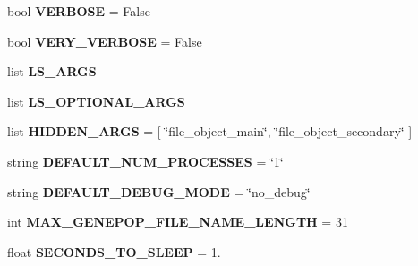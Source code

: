\begin{DoxyCompactItemize}
\item 
bool {\bfseries V\+E\+R\+B\+O\+SE} = False\hypertarget{namespacenegui_1_1pgdriveneestimator_aeae180a6a906ac89f58c9af1f6c8fd77}{}\label{namespacenegui_1_1pgdriveneestimator_aeae180a6a906ac89f58c9af1f6c8fd77}

\item 
bool {\bfseries V\+E\+R\+Y\+\_\+\+V\+E\+R\+B\+O\+SE} = False\hypertarget{namespacenegui_1_1pgdriveneestimator_ab3e4d5f9e16fe1e71748c637b908eb55}{}\label{namespacenegui_1_1pgdriveneestimator_ab3e4d5f9e16fe1e71748c637b908eb55}

\item 
list {\bfseries L\+S\+\_\+\+A\+R\+GS}
\item 
list {\bfseries L\+S\+\_\+\+O\+P\+T\+I\+O\+N\+A\+L\+\_\+\+A\+R\+GS}
\item 
list {\bfseries H\+I\+D\+D\+E\+N\+\_\+\+A\+R\+GS} = \mbox{[} \char`\"{}file\+\_\+object\+\_\+main\char`\"{}, \char`\"{}file\+\_\+object\+\_\+secondary\char`\"{} \mbox{]}\hypertarget{namespacenegui_1_1pgdriveneestimator_a6fd954e84a4eb8eeb2a1a63e5f53c716}{}\label{namespacenegui_1_1pgdriveneestimator_a6fd954e84a4eb8eeb2a1a63e5f53c716}

\item 
string {\bfseries D\+E\+F\+A\+U\+L\+T\+\_\+\+N\+U\+M\+\_\+\+P\+R\+O\+C\+E\+S\+S\+ES} = \char`\"{}1\char`\"{}\hypertarget{namespacenegui_1_1pgdriveneestimator_a2e948c0ce60271c8e6e3b08edb453839}{}\label{namespacenegui_1_1pgdriveneestimator_a2e948c0ce60271c8e6e3b08edb453839}

\item 
string {\bfseries D\+E\+F\+A\+U\+L\+T\+\_\+\+D\+E\+B\+U\+G\+\_\+\+M\+O\+DE} = \char`\"{}no\+\_\+debug\char`\"{}\hypertarget{namespacenegui_1_1pgdriveneestimator_af83e46ff34683de5b4e27783ac68425f}{}\label{namespacenegui_1_1pgdriveneestimator_af83e46ff34683de5b4e27783ac68425f}

\item 
int {\bfseries M\+A\+X\+\_\+\+G\+E\+N\+E\+P\+O\+P\+\_\+\+F\+I\+L\+E\+\_\+\+N\+A\+M\+E\+\_\+\+L\+E\+N\+G\+TH} = 31\hypertarget{namespacenegui_1_1pgdriveneestimator_aaaca09e92573315d60360d27b83338ee}{}\label{namespacenegui_1_1pgdriveneestimator_aaaca09e92573315d60360d27b83338ee}

\item 
float {\bfseries S\+E\+C\+O\+N\+D\+S\+\_\+\+T\+O\+\_\+\+S\+L\+E\+EP} = 1.\hypertarget{namespacenegui_1_1pgdriveneestimator_a1363a44c877cd0837fd1f4eae1f2d6e9}{}\label{namespacenegui_1_1pgdriveneestimator_a1363a44c877cd0837fd1f4eae1f2d6e9}


\end{DoxyCompactItemize}
